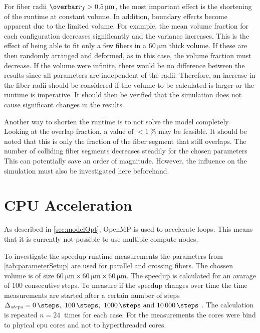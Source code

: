 %
For fiber radii $\fiberRadiusMean > \SI{0.5}{\micro\meter}$, the most important effect is the shortening of the runtime at constant volume.
In addition, boundary effects become apparent due to the limited volume.
For example, the mean volume fraction for each configuration decreases significantly and the variance increases.
This is the effect of being able to fit only a few fibers in a $\SI{60}{\micro\meter}$ thick volume.
If these are then randomly arranged and deformed, as in this case, the volume fraction must decrease.
If the volume were infinite, there would be no difference between the results since all parameters are independent of the radii.
Therefore, an increase in the fiber radii should be considered if the volume to be calculated is larger or the runtime is imperative.
It should then be verified that the simulation does not cause significant changes in the results.
\par
%
Another way to shorten the runtime is to not solve the model completely.
Looking at the overlap fraction, a value of $<\SI{1}{\percent}$ may be feasible.
It should be noted that this is only the fraction of the fiber segment that still overlaps.
The number of colliding fiber segments decreases steadily for the chosen parameters
This can potentially save an order of magnitude.
However, the influence on the simulation must also be investigated here beforehand.
%
%
%
\section{CPU Acceleration}
%
As described in \cref{sec:modelOpt}, \ac{OpenMP} is used to accelerate  loops.
This means that it is currently not possible to use multiple compute nodes.
\par
% 
To investigate the speedup runtime measurements the parameters from \cref{tab:parameterSetup} are used for parallel and crossing fibers.
The chossen volume is of size $\SI{60}{\micro\meter} \times \SI{60}{\micro\meter} \times \SI{60}{\micro\meter}$.
The speedup is calculated for an avarage of 100 consecutive steps.
To measure if the speedup changes over time the time measurements are started after a certain number of steps $\Delta_{\mathit{steps}} = \SIlist{0;100;1000;10000}{\steps}$ .
The calculation is repeated $n=\SI{24}{}$ times for each case.
For the measurements the cores were bind to phyical cpu cores and not to hyperthreaded cores.
%
% 
% 
